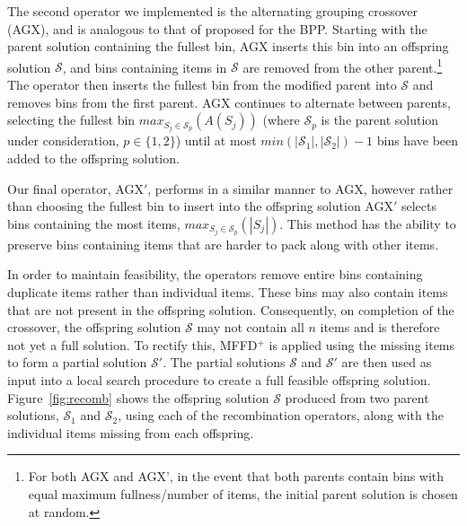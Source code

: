 \documentclass[authoryear]{elsarticle}
\begin{document}

The second operator we implemented is the alternating grouping crossover (AGX), and is analogous to that of \citet{quiroz2015} proposed for the BPP. Starting with the parent solution containing the fullest bin, AGX inserts this bin into an offspring solution $\mathcal{S}$, and bins containing items in $\mathcal{S}$ are removed from the other parent.\footnote{For both AGX and AGX', in the event that both parents contain bins with equal maximum fullness/number of items, the initial parent solution is chosen at random.} The operator then inserts the fullest bin from the modified parent into $\mathcal{S}$ and removes bins from the first parent. AGX continues to alternate between parents, selecting the fullest bin $max_{S_j \in \mathcal{S}_p} (A(S_j))$ (where $\mathcal{S}_p$ is the parent solution under consideration, $p \in \{1,2\}$) until at most $min (|\mathcal{S}_1|,|\mathcal{S}_2|) - 1$ bins have been added to the offspring solution.

Our final operator, AGX$'$, performs in a similar manner to AGX, however rather than choosing the fullest bin to insert into the offspring solution AGX$'$ selects bins containing the most items, $max_{S_j \in \mathcal{S}_p} (|S_j|)$. This method has the ability to preserve bins containing items that are harder to pack along with other items. 

In order to maintain feasibility, the operators remove entire bins containing duplicate items rather than individual items. These bins may also contain items that are not present in the offspring solution. Consequently, on completion of the crossover, the offspring solution $\mathcal{S}$ may not contain all $n$ items and is therefore not yet a full solution. To rectify this, MFFD$^+$ is applied using the missing items to form a partial solution $\mathcal{S}'$. The partial solutions $\mathcal{S}$ and $\mathcal{S}'$ are then used as input into a local search procedure to create a full feasible offspring solution. Figure~\ref{fig:recomb} shows the offspring solution $\mathcal{S}$ produced from two parent solutions, $\mathcal{S}_1$ and $\mathcal{S}_2$, using each of the recombination operators, along with the individual items missing from each offspring.
\end{document}
